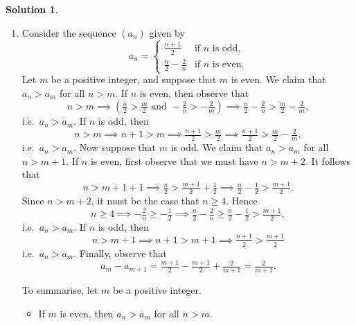 \documentclass[12pt]{article}
\theoremstyle{definition}
\theoremstyle{exercise}
\theoremstyle{solution}
\newtheorem*{solution}{Solution}
\begin{document}
\begin{solution}
    \begin{enumerate}
        \item Consider the sequence \( (a_n) \) given by
        \[
            a_n = \begin{cases}
                \tfrac{n+1}{2} & \text{if } n \text{ is odd}, \\
                \tfrac{n}{2} - \tfrac{2}{n} & \text{if } n \text{ is even}.
            \end{cases}
        \]
        Let \( m \) be a positive integer, and suppose that \( m \) is even. We claim that \( a_n > a_m \) for all \( n > m \). If \( n \) is even, then observe that
        \[
            n > m \implies \left( \tfrac{n}{2} > \tfrac{m}{2} \text{  and  } -\tfrac{2}{n} > -\tfrac{2}{m} \right) \implies \tfrac{n}{2} - \tfrac{2}{n} > \tfrac{m}{2} - \tfrac{2}{m},
        \]
        i.e.\ \( a_n > a_m \). If \( n \) is odd, then
        \[
            n > m \implies n + 1 > m \implies \tfrac{n+1}{2} > \tfrac{m}{2} \implies \tfrac{n+1}{2} > \tfrac{m}{2} - \tfrac{2}{m},
        \]
        i.e.\ \( a_n > a_m \). Now suppose that \( m \) is odd. We claim that \( a_n > a_m \) for all \( n > m + 1 \). If \( n \) is even, first observe that we must have \( n > m + 2 \). It follows that
        \[
            n > m + 1 + 1 \implies \tfrac{n}{2} > \tfrac{m+1}{2} + \tfrac{1}{2} \implies \tfrac{n}{2} - \tfrac{1}{2} > \tfrac{m+1}{2}.
        \]
        Since \( n > m + 2 \), it must be the case that \( n \geq 4 \). Hence
        \[
            n \geq 4 \implies -\tfrac{2}{n} \geq -\tfrac{1}{2} \implies \tfrac{n}{2} - \tfrac{2}{n} \geq \tfrac{n}{2} - \tfrac{1}{2} > \tfrac{m+1}{2},
        \]
        i.e.\ \( a_n > a_m \). If \( n \) is odd, then
        \[
            n > m + 1 \implies n + 1 > m + 1 \implies \tfrac{n+1}{2} > \tfrac{m+1}{2}
        \]
        i.e.\ \( a_n > a_m \). Finally, observe that
        \[
            a_m - a_{m+1} = \tfrac{m+1}{2} - \tfrac{m+1}{2} + \tfrac{2}{m+1} = \tfrac{2}{m+1}.
        \]

        To summarise, let \( m \) be a positive integer.
        \begin{itemize}
            \item If \( m \) is even, then \( a_n > a_m \) for all \( n > m \).


\end{itemize}
\end{enumerate}
\end{solution}
\end{document}
